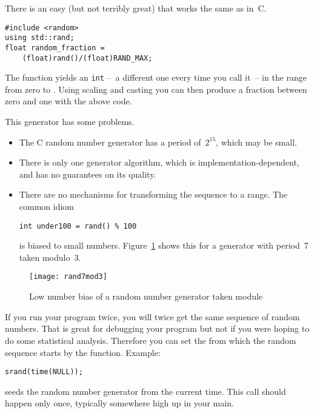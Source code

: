 There is an easy (but not terribly great)
that works the same as in~C.
%
\begin{lstlisting}
#include <random>
using std::rand;
float random_fraction =
    (float)rand()/(float)RAND_MAX;
\end{lstlisting}
%
The function  yields an \lstinline{int}
--~a different one every time you call it~--
in the range from zero to .
Using scaling and casting you can then produce a fraction between zero
and one with the above code.

This generator has some problems.

\begin{itemize}
\item The C random number generator has a period of~$2^{15}$, which may be small.
\item There is only one generator algorithm, which is implementation-dependent,
  and has no guarantees on its quality.
\item There are no mechanisms for transforming the sequence to a range.
  The common idiom
\begin{lstlisting}
int under100 = rand() % 100
\end{lstlisting}
is biased to small numbers. Figure~\ref{fig:rand7mod3} shows this
for a generator with period~7 taken modulo~3.
\end{itemize}

\begin{figure}[t]
  \texttt{[image: rand7mod3]}
  \caption{Low number bias of a random number generator taken module}
  \label{fig:rand7mod3}
\end{figure}

If you run your program twice, you will twice get the same sequence of
random numbers. That is great for debugging your program but not if
you were hoping to do some statistical analysis. Therefore you can set
the  from which the random sequence
starts by the  function. Example:
\begin{lstlisting}
srand(time(NULL));
\end{lstlisting}
seeds the random number generator from the current time.
This call should happen only once, typically somewhere high up in your main.

